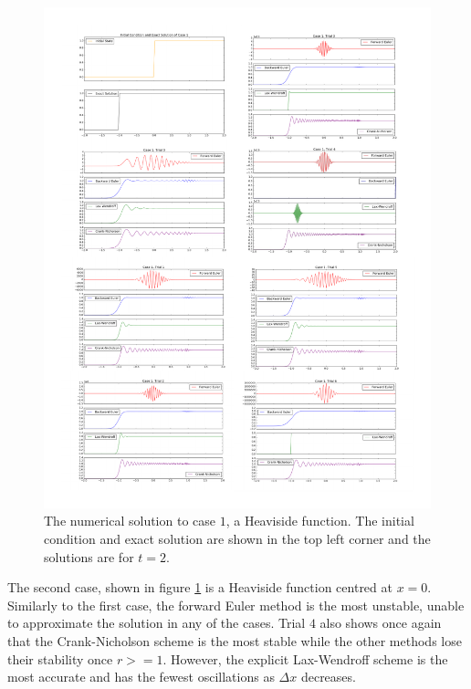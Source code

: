 \documentclass[twocolumn]{article}
\begin{document}
\begin{figure}
  \centering
  \includegraphics[width=\textwidth]{case1}
  \caption{
    The numerical solution to case $1$, a Heaviside function. The
    initial condition and exact solution are shown in the top left
    corner and the solutions are for $t=2$.
  }
  \label{fig:case1}
\end{figure}

The second case, shown in figure \ref{fig:case1} is a Heaviside
function centred at $x=0$. Similarly to the first case, the forward
Euler method is the most unstable, unable to approximate the solution
in any of the cases. Trial $4$ also shows once again that the
Crank-Nicholson scheme is the most stable while the other methods lose
their stability once $r >= 1$. However, the explicit Lax-Wendroff
scheme is the most accurate and has the fewest oscillations as $\Delta
x$ decreases.
\end{document}

